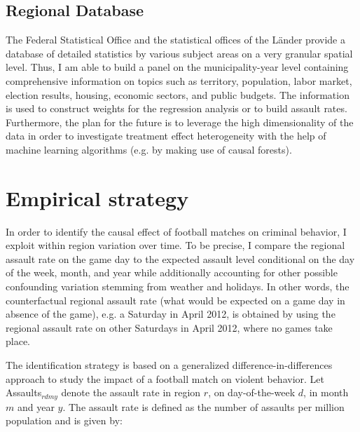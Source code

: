 \subsection{Regional Database}
The Federal Statistical Office and the statistical offices of the Länder provide a database of detailed statistics by various subject areas on a very granular spatial level. Thus, I am able to build a panel on the municipality-year level containing comprehensive information on topics such as territory, population, labor market, election results, housing, economic sectors, and public budgets. The information is used to construct weights for the regression analysis or to build assault rates. {\color{red}Furthermore, the plan for the future is to leverage the high dimensionality of the data in order to investigate treatment effect heterogeneity with the help of machine learning algorithms (e.g. by making use of causal forests).} 







\bigskip
\section{Empirical strategy}\label{sec_soc_ext:empirical_strategy}

In order to identify the causal effect of football matches on criminal behavior, I exploit within region variation over time. To be precise, I compare the regional assault rate on the game day to the expected assault level conditional on the day of the week, month, and year while additionally accounting for other possible confounding variation stemming from weather and holidays. In other words, the counterfactual regional assault rate (what would be expected on a game day in absence of the game), e.g. a Saturday in April 2012, is obtained by using the regional assault rate on other Saturdays in April 2012, where no games take place. %


The identification strategy is based on a generalized difference-in-differences approach to study the impact of a football match on violent behavior. Let Assaults$_{rdmy}$ denote the assault rate in region $r$, on day-of-the-week $d$, in month $m$ and year $y$. The assault rate is defined as the number of assaults per million population and is given by:

